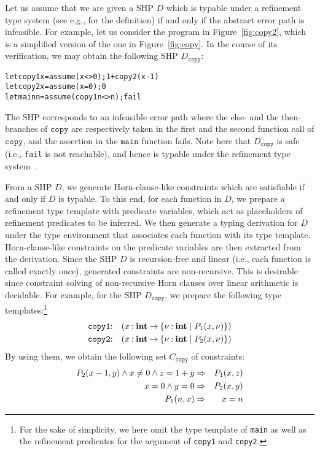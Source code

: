 Let us assume that we are given a SHP \(D\) which is typable under a
refinement type system (see e.g., \cite{Unno2009} for the definition) if
and only if the abstract error path is infeasible.  For example, let us
consider the program in Figure~\ref{fig:copy2}, which is a simplified
version of the one in Figure~\ref{fig:copy}.  In the course of its
verification, we may obtain the following SHP \(D_{\texttt{copy}}\):
\begin{alltt}
let copy1 x = assume (x<>0); 1 + copy2 (x-1)
let copy2 x = assume (x=0); 0
let main n = assume (copy1 n <> n); fail
\end{alltt}
The SHP corresponds to an infeasible error path where the else- and the
then-branches of \(\texttt{copy}\) are respectively taken in the first
and the second function call of \(\texttt{copy}\), and the assertion in
the \(\texttt{main}\) function fails.  Note here that
\(D_{\texttt{copy}}\) is safe (i.e., \texttt{fail} is not reachable),
and hence is typable under the refinement type system~\cite{Unno2009}.

From a SHP \(D\), we generate Horn-clause-like constraints which are
satisfiable if and only if \(D\) is typable.  To this end, for each
function in \(D\), we prepare a refinement type template with predicate
variables, which act as placeholders of refinement predicates to be
inferred.  We then generate a typing derivation for \(D\) under the type
environment that associates each function with its type template.
Horn-clause-like constraints on the predicate variables are then
extracted from the derivation.  Since the SHP \(D\) is recursion-free
and linear (i.e., each function is called exactly once), generated
constraints are non-recursive.  This is desirable since constraint
solving of non-recursive Horn clauses over linear arithmetic is
decidable.  For example, for the SHP \(D_{\texttt{copy}}\), we prepare
the following type templates:\footnote{For the sake of simplicity, we
here omit the type template of \texttt{main} as well as the refinement
predicates for the argument of \texttt{copy1} and \texttt{copy2}.}
\begin{eqnarray*}
\texttt{copy1}&\mathbin{:}&(x\mathbin{:}{\mathbf{int}}\mathbin{\rightarrow}{\{{\nu\mathbin{:}\mathbf{int} \mid P_1(x,\nu)}\}}) \\
\texttt{copy2}&\mathbin{:}&(x\mathbin{:}{\mathbf{int}}\mathbin{\rightarrow}{\{{\nu\mathbin{:}\mathbf{int} \mid P_2(x,\nu)}\}})
\end{eqnarray*}
By using them, we obtain the following set \(C_{\texttt{copy}}\) of
constraints:
\begin{eqnarray*}
P_2(x-1,y) \land x\neq0 \land z=1+y &\Rightarrow& P_1(x,z) \\
x=0 \land y=0 &\Rightarrow& P_2(x,y) \\
P_1(n,x) &\Rightarrow& x=n
\end{eqnarray*}

